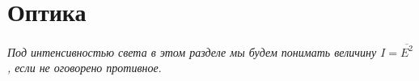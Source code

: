 \documentclass[a4paper,12pt]{article}
\begin{document}

\newpage

\newpage

\newpage

\newpage

\newpage

\newpage

\newpage

\newpage

\newpage

\newpage

\newpage

\newpage

\newpage

\newpage

\part{Оптика}

\textit{Под интенсивностью света в этом разделе мы будем понимать величину $I = \overline{E^2}$, если не оговорено противное}.

\newpage

\newpage

\newpage

\newpage

\newpage

\newpage

\newpage

\newpage

\end{document}
